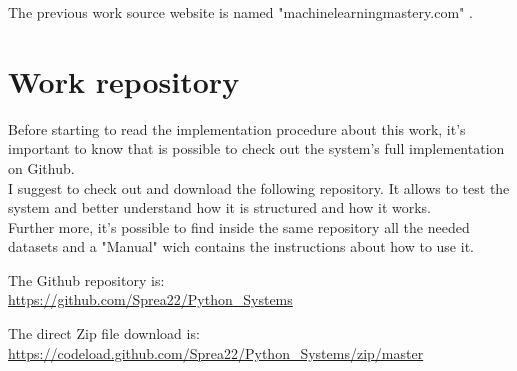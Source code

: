 The previous work source website is named "machinelearningmastery.com" \cite{previousWork}.


\section{Work repository}
\label{Repository}
Before starting to read the implementation procedure about this work, it's important to know that is possible to check out the system's full implementation on Github.\\
I suggest to check out and download the following repository. It allows to test the system and better understand how it is structured and how it works.\\
Further more, it's possible to find inside the same repository all the needed datasets and a "Manual" wich contains the instructions about how to use it.

The Github repository is:\\
\url{https://github.com/Sprea22/Python_Systems}

The direct Zip file download is:\\
\url{https://codeload.github.com/Sprea22/Python_Systems/zip/master}

